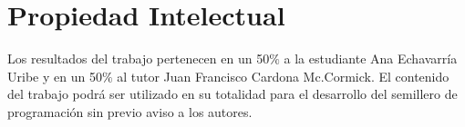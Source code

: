 \documentclass[11pt, oneside]{article}
\theoremstyle{definition}
\theoremstyle{remark}
\begin{document}
\section{Propiedad Intelectual}
Los resultados del trabajo pertenecen en un 50$\%$ a la estudiante Ana Echavarría Uribe y en un 50$\%$ al tutor Juan Francisco Cardona Mc.Cormick. El contenido del trabajo podrá ser utilizado en su totalidad para el desarrollo del semillero de programación sin previo aviso a los autores.





\end{document}
